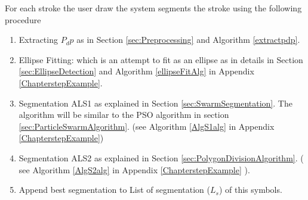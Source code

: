 For each stroke the user draw the system segments the stroke using the following procedure

\begin{enumerate}
\item Extracting $P_dp$ as in Section \ref{sec:Preprocessing} and Algorithm \ref{extractpdp}.
\item Ellipse Fitting: which is an attempt to fit as an ellipse as in details in Section \ref{sec:EllipseDetection} and Algorithm \ref{ellipseFitAlg} in Appendix \ref{ChapterstepExample}.
\item Segmentation ALS1 as explained in Section \ref{sec:SwarmSegmentation}. The algorithm will be similar to the PSO algorithm  in section \ref{sec:ParticleSwarmAlgorithm}. (see Algorithm \ref{AlgS1alg} in Appendix \ref{ChapterstepExample})
\item Segmentation ALS2 as explained in Section \ref{sec:PolygonDivisionAlgorithm}. ( see Algorithm \ref{AlgS2alg} in Appendix \ref{ChapterstepExample} ). 
\item Append best segmentation to List of segmentation ($L_s$) of this symbols. 
\end{enumerate}


